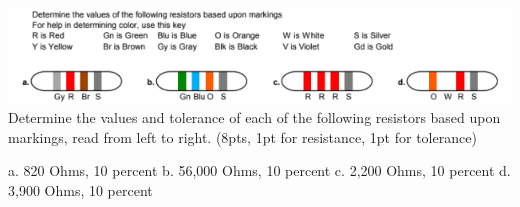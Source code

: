\documentclass[10pt]{examdesign}
\begin{document}
\begin{shortanswer}[title={Short Answer, 52 pts total},rearrange=no,resetcounter=no]
\begin{question}
        \includegraphics[width=15cm]{circuit7.png}
        \\Determine the values and tolerance of each of the following resistors based upon markings, read from left to right. (8pts, 1pt for resistance, 1pt for tolerance)
        \begin{answer}
        a. 820 Ohms, 10 percent
        b. 56,000 Ohms, 10 percent
        c. 2,200 Ohms, 10 percent
        d. 3,900 Ohms, 10 percent
        \end{answer}
        \end{question}
    \end{shortanswer}
	\pagebreak
\end{document}
